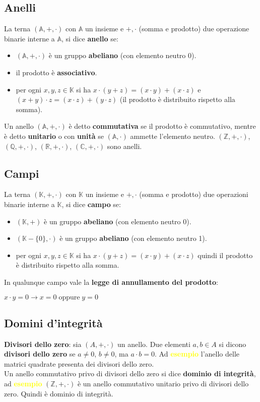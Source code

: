 \subsection{Anelli}
La terna $(\mathbb{A}, +, \cdot)$ con $\mathbb{A}$ un insieme e $+, \cdot$ (somma e prodotto) due operazione binarie interne a $\mathbb{A}$, si dice \textbf{anello} se:
\begin{itemize}
    \item $(\mathbb{A}, +, \cdot)$ è un gruppo \textbf{abeliano} (con elemento neutro 0).
    \item il prodotto è \textbf{associativo}.
    \item per ogni $x,y,z \in \mathbb{K}$ si ha $x \cdot (y + z) = (x \cdot y) + (x \cdot z)$ e $(x + y) \cdot z = (x \cdot z) + (y \cdot z)$ (il prodotto è distribuito rispetto alla somma).
\end{itemize}
Un anello $(\mathbb{A}, +, \cdot)$ è detto \textbf{commutativa} se il prodotto è commutativo, mentre è detto \textbf{unitario} o con \textbf{unità} se $(\mathbb{A}, \cdot)$ ammette l'elemento neutro. $(\mathbb{Z}, +, \cdot)$, $(\mathbb{Q}, +, \cdot)$, $(\mathbb{R}, +, \cdot)$, $(\mathbb{C}, +, \cdot)$ sono anelli.

\newpage
\subsection{Campi}
La terna $(\mathbb{K}, +, \cdot)$ con $\mathbb{K}$ un insieme e $+, \cdot$ (somma e prodotto) due operazioni binarie interne a $\mathbb{K}$, si dice \textbf{campo} se:
\begin{itemize}
    \item $(\mathbb{K}, +)$ è un gruppo \textbf{abeliano} (con elemento neutro 0).
    \item $(\mathbb{K} - \{0\}, \cdot)$ è un gruppo \textbf{abeliano} (con elemento neutro 1).
    \item per ogni $x,y,z \in \mathbb{K}$ si ha $x \cdot (y + z) = (x \cdot y) + (x \cdot z)$ quindi il prodotto è distribuito rispetto alla somma.
\end{itemize}
In qualunque campo vale la \textbf{legge di annullamento del prodotto}:
\begin{center}
    $x \cdot y = 0 \rightarrow x = 0 \; \text{oppure} \; y = 0$
\end{center}

\subsection{Domini d'integrità}
\textbf{Divisori dello zero}: sia $(A, +, \cdot)$ un anello. Due elementi $a,b \in A$ si dicono \textbf{divisori dello zero} se $a \neq 0$, $b \neq 0$, ma $a \cdot b = 0$. Ad \textcolor{yellow}{\textbf{esempio}} l'anello delle matrici quadrate presenta dei divisori dello zero. \\
Un anello commutativo privo di divisori dello zero si dice \textbf{dominio di integrità}, ad \textcolor{yellow}{\textbf{esempio}} $(\mathbb{Z}, +, \cdot)$ è un anello commutativo unitario privo di divisori dello zero. Quindi è dominio di integrità.

